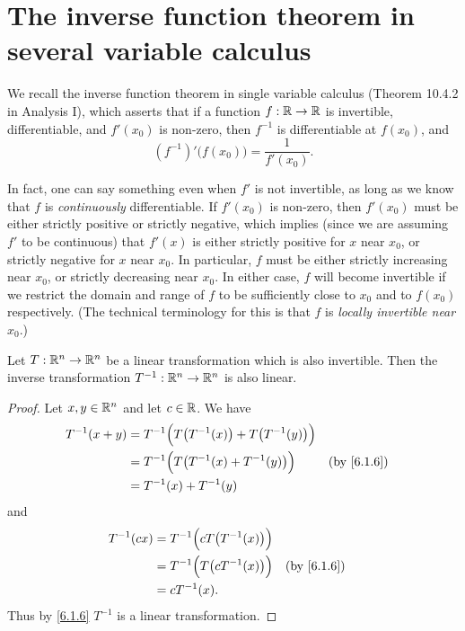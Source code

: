\section{The inverse function theorem in several variable calculus}\label{sec:6.7}

\begin{note}
  We recall the inverse function theorem in single variable calculus (Theorem 10.4.2 in Analysis I), which asserts that if a function \(f : \mathbb{R} \to \mathbb{R}\) is invertible, differentiable, and \(f'(x_0)\) is non-zero, then \(f^{-1}\) is differentiable at \(f(x_0)\), and
  \[
    (f^{-1})'\big(f(x_0)\big) = \dfrac{1}{f'(x_0)}.
  \]

  In fact, one can say something even when \(f'\) is not invertible, as long as we know that \(f\) is \emph{continuously} differentiable.
  If \(f'(x_0)\) is non-zero, then \(f'(x_0)\) must be either strictly positive or strictly negative, which implies (since we are assuming \(f'\) to be continuous) that \(f'(x)\) is either strictly positive for \(x\) near \(x_0\), or strictly negative for \(x\) near \(x_0\).
  In particular, \(f\) must be either strictly increasing near \(x_0\), or strictly decreasing near \(x_0\).
  In either case, \(f\) will become invertible if we restrict the domain and range of \(f\) to be sufficiently close to \(x_0\) and to \(f(x_0)\) respectively.
  (The technical terminology for this is that \(f\) is \emph{locally invertible near \(x_0\)}.)
\end{note}

\begin{lem}\label{6.7.1}
  Let \(T : \mathbb{R}^n \to \mathbb{R}^n\) be a linear transformation which is also invertible.
  Then the inverse transformation \(T^{-1} : \mathbb{R}^n \to \mathbb{R}^n\) is also linear.
\end{lem}

\begin{proof}
  Let \(x, y \in \mathbb{R}^n\) and let \(c \in \mathbb{R}\).
  We have
  \begin{align*}
    T^{-1}(x + y) & = T^{-1}\Big(T\big(T^{-1}(x)\big) + T\big(T^{-1}(y)\big)\Big)                 \\
                  & = T^{-1}\Big(T\big(T^{-1}(x) + T^{-1}(y)\big)\Big)            &  & \by{6.1.6} \\
                  & = T^{-1}(x) + T^{-1}(y)
  \end{align*}
  and
  \begin{align*}
    T^{-1}(cx) & = T^{-1}\Big(c T\big(T^{-1}(x)\big)\Big)                 \\
               & = T^{-1}\Big(T\big(c T^{-1}(x)\big)\Big) &  & \by{6.1.6} \\
               & = c T^{-1}(x).
  \end{align*}
  Thus by \cref{6.1.6} \(T^{-1}\) is a linear transformation.
\end{proof}

